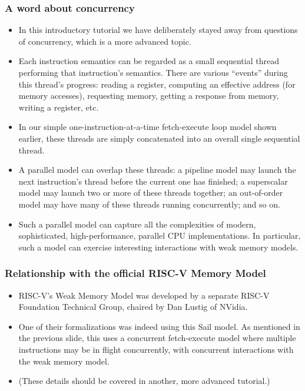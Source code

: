 \documentclass[aspectratio=169]{beamer}
\newcommand{\slidefont}{\scriptsize}
\begin{document}
\begin{frame}
  \frametitle{A word about concurrency}

  \slidefont

  \begin{itemize}

  \item
    In this introductory tutorial we have deliberately stayed away
    from questions of concurrency, which is a more advanced topic.

  \item
    Each instruction semantics can be regarded as a small sequential
    thread performing that instruction's semantics.  There are various
    ``events'' during this thread's progress: reading a register,
    computing an effective address (for memory accesses), requesting
    memory, getting a response from memory, writing a register, etc.

  \item
    In our simple one-instruction-at-a-time fetch-execute loop model
    shown earlier, these threads are simply concatenated into an
    overall single sequential thread.

  \item
    A parallel model can overlap these threads: a pipeline model may
    launch the next instruction's thread before the current one has
    finished; a superscalar model may launch two or more of these
    threads together; an out-of-order model may have many of these
    threads running concurrently; and so on.

  \item
    Such a parallel model can capture all the complexities of modern,
    sophisticated, high-performance, parallel CPU implementations. In
    particular, such a model can exercise interesting interactions
    with weak memory models.

  \end{itemize}

\end{frame}


\begin{frame}
  \frametitle{Relationship with the official RISC-V Memory Model}

  \slidefont

  \begin{itemize}
  \item
    RISC-V's Weak Memory Model was developed by a separate RISC-V
    Foundation Technical Group, chaired by Dan Lustig of NVidia.

  \item 
    One of their formalizations was indeed using this Sail model.  As
    mentioned in the previous slide, this uses a concurrent
    fetch-execute model where multiple instructions may be in flight
    concurrently, with concurrent interactions with the weak memory
    model.

  \item
    (These details should be covered in another, more advanced tutorial.)

  \end{itemize}

\end{frame}
\end{document}
